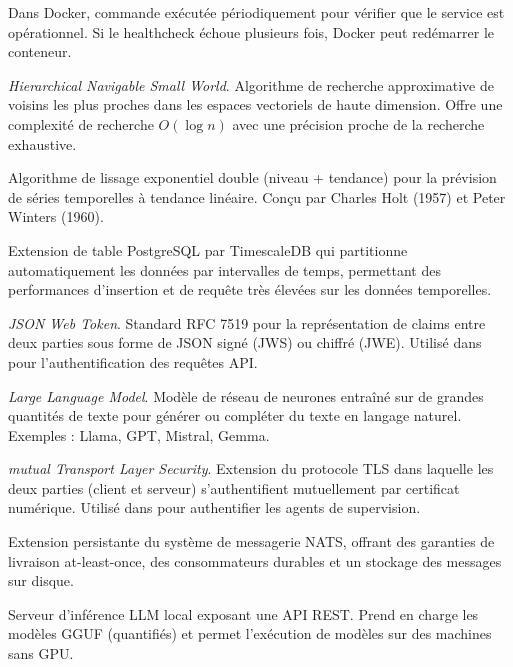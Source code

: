 \begin{description}[leftmargin=3.5cm, style=nextline, font=\bfseries\color{NavyBlue}]
  \item[Healthcheck]
    Dans Docker, commande exécutée périodiquement pour vérifier que le service
    est opérationnel. Si le healthcheck échoue plusieurs fois, Docker peut
    redémarrer le conteneur.

  \item[HNSW]
    \textit{Hierarchical Navigable Small World}. Algorithme de recherche approximative
    de voisins les plus proches dans les espaces vectoriels de haute dimension.
    Offre une complexité de recherche $O(\log n)$ avec une précision proche
    de la recherche exhaustive.

  \item[Holt-Winters]
    Algorithme de lissage exponentiel double (niveau + tendance) pour la prévision
    de séries temporelles à tendance linéaire. Conçu par Charles Holt (1957) et
    Peter Winters (1960).

  \item[Hypertable]
    Extension de table PostgreSQL par TimescaleDB qui partitionne automatiquement
    les données par intervalles de temps, permettant des performances d'insertion
    et de requête très élevées sur les données temporelles.

  \item[JWT]
    \textit{JSON Web Token}. Standard RFC 7519 pour la représentation de claims
    entre deux parties sous forme de JSON signé (JWS) ou chiffré (JWE). Utilisé
    dans \caimp{} pour l'authentification des requêtes API.

  \item[LLM]
    \textit{Large Language Model}. Modèle de réseau de neurones entraîné sur de
    grandes quantités de texte pour générer ou compléter du texte en langage
    naturel. Exemples : Llama, GPT, Mistral, Gemma.

  \item[mTLS]
    \textit{mutual Transport Layer Security}. Extension du protocole TLS dans
    laquelle les deux parties (client et serveur) s'authentifient mutuellement
    par certificat numérique. Utilisé dans \caimp{} pour authentifier les agents
    de supervision.

  \item[NATS JetStream]
    Extension persistante du système de messagerie NATS, offrant des garanties
    de livraison at-least-once, des consommateurs durables et un stockage
    des messages sur disque.

  \item[Ollama]
    Serveur d'inférence LLM local exposant une API REST. Prend en charge les
    modèles GGUF (quantifiés) et permet l'exécution de modèles sur des machines
    sans GPU.


\end{description}
